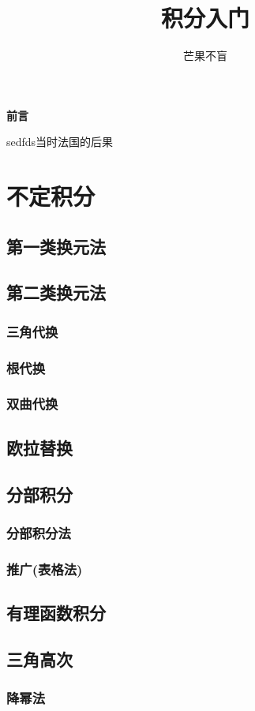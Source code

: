 \documentclass{mycls}
\title{积分入门}
\author{芒果不盲}
\begin{document}
\maketitle
\begin{center}
 \Huge   \bfseries \heiti 前言
\end{center}
\tableofcontents
\newpage
{\xingkai \zhlipsum[1]}
sedfds当时法国的后果 
\chapter{不定积分}
\section{第一类换元法}
\section{第二类换元法}
\subsection{三角代换}
\subsection{根代换}
\subsection{双曲代换}
\section{欧拉替换}
\section{分部积分}
\subsection{分部积分法}
\subsection{推广(表格法)}
\section{有理函数积分}
\section{三角高次}
\subsection{降幂法}
\end{document}
